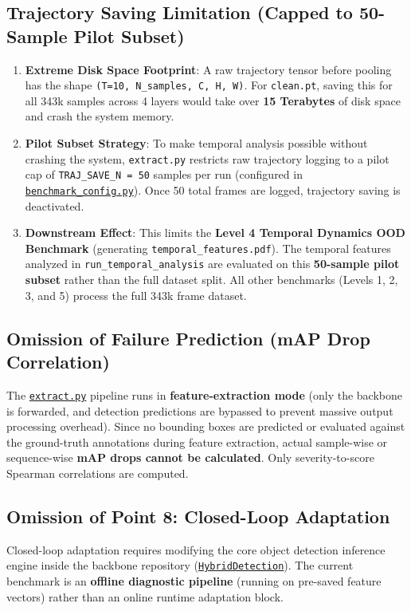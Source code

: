 \documentclass[11pt,a4paper]{article}
\begin{document}
\subsection{Trajectory Saving Limitation (Capped to 50-Sample Pilot Subset)}
\begin{enumerate}
    \item \textbf{Extreme Disk Space Footprint}: A raw trajectory tensor before pooling has the shape \texttt{(T=10, N\_samples, C, H, W)}. For \texttt{clean.pt}, saving this for all 343k samples across 4 layers would take over \textbf{15 Terabytes} of disk space and crash the system memory.
    \item \textbf{Pilot Subset Strategy}: To make temporal analysis possible without crashing the system, \texttt{extract.py} restricts raw trajectory logging to a pilot cap of \texttt{TRAJ\_SAVE\_N = 50} samples per run (configured in \href{run:benchmark_config.py}{\texttt{benchmark\_config.py}}). Once 50 total frames are logged, trajectory saving is deactivated.
    \item \textbf{Downstream Effect}: This limits the \textbf{Level 4 Temporal Dynamics OOD Benchmark} (generating \texttt{temporal\_features.pdf}). The temporal features analyzed in \texttt{run\_temporal\_analysis} are evaluated on this \textbf{50-sample pilot subset} rather than the full dataset split. All other benchmarks (Levels 1, 2, 3, and 5) process the full 343k frame dataset.
\end{enumerate}

\subsection{Omission of Failure Prediction (mAP Drop Correlation)}
The \href{run:extract.py}{\texttt{extract.py}} pipeline runs in \textbf{feature-extraction mode} (only the backbone is forwarded, and detection predictions are bypassed to prevent massive output processing overhead). Since no bounding boxes are predicted or evaluated against the ground-truth annotations during feature extraction, actual sample-wise or sequence-wise \textbf{mAP drops cannot be calculated}. Only severity-to-score Spearman correlations are computed.

\subsection{Omission of Point 8: Closed-Loop Adaptation}
Closed-loop adaptation requires modifying the core object detection inference engine inside the backbone repository (\href{run:HybridDetection}{\texttt{HybridDetection}}). The current benchmark is an \textbf{offline diagnostic pipeline} (running on pre-saved feature vectors) rather than an online runtime adaptation block.
\end{document}
